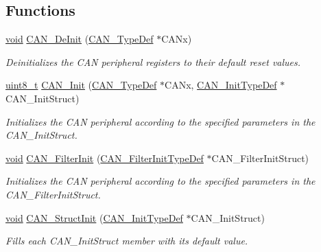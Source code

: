 \subsection*{Functions}
\begin{DoxyCompactItemize}
\item 
\hyperlink{usb__devapi_8h_afabf60e7f57651d6d595a02c75f07cd0}{void} \hyperlink{group___c_a_n___private___functions_ga002b74cd69574a14b17ad445090245cd}{C\+A\+N\+\_\+\+De\+Init} (\hyperlink{struct_c_a_n___type_def}{C\+A\+N\+\_\+\+Type\+Def} $\ast$C\+A\+Nx)
\begin{DoxyCompactList}\small\item\em Deinitializes the C\+AN peripheral registers to their default reset values. \end{DoxyCompactList}\item 
\hyperlink{_p_e___types_8h_aba7bc1797add20fe3efdf37ced1182c5}{uint8\+\_\+t} \hyperlink{group___c_a_n___private___functions_ga9023c35a9ab931ad4513fc5d19b4bd6c}{C\+A\+N\+\_\+\+Init} (\hyperlink{struct_c_a_n___type_def}{C\+A\+N\+\_\+\+Type\+Def} $\ast$C\+A\+Nx, \hyperlink{struct_c_a_n___init_type_def}{C\+A\+N\+\_\+\+Init\+Type\+Def} $\ast$C\+A\+N\+\_\+\+Init\+Struct)
\begin{DoxyCompactList}\small\item\em Initializes the C\+AN peripheral according to the specified parameters in the C\+A\+N\+\_\+\+Init\+Struct. \end{DoxyCompactList}\item 
\hyperlink{usb__devapi_8h_afabf60e7f57651d6d595a02c75f07cd0}{void} \hyperlink{group___c_a_n___private___functions_ga39476830280340363c51041be6b12647}{C\+A\+N\+\_\+\+Filter\+Init} (\hyperlink{struct_c_a_n___filter_init_type_def}{C\+A\+N\+\_\+\+Filter\+Init\+Type\+Def} $\ast$C\+A\+N\+\_\+\+Filter\+Init\+Struct)
\begin{DoxyCompactList}\small\item\em Initializes the C\+AN peripheral according to the specified parameters in the C\+A\+N\+\_\+\+Filter\+Init\+Struct. \end{DoxyCompactList}\item 
\hyperlink{usb__devapi_8h_afabf60e7f57651d6d595a02c75f07cd0}{void} \hyperlink{group___c_a_n___private___functions_gad77ad810868ed111755fc9e8ae0c7646}{C\+A\+N\+\_\+\+Struct\+Init} (\hyperlink{struct_c_a_n___init_type_def}{C\+A\+N\+\_\+\+Init\+Type\+Def} $\ast$C\+A\+N\+\_\+\+Init\+Struct)
\begin{DoxyCompactList}\small\item\em Fills each C\+A\+N\+\_\+\+Init\+Struct member with its default value. \end{DoxyCompactList}\item 

\end{DoxyCompactItemize}
